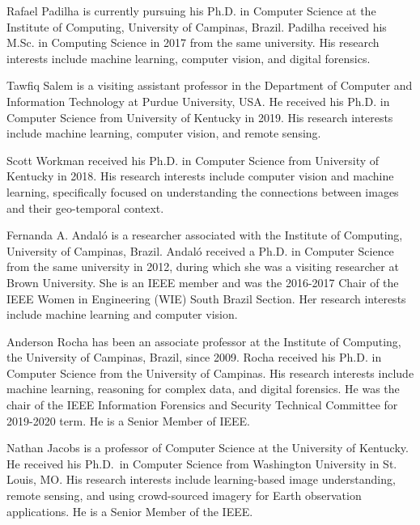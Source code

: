 \documentclass[journal]{IEEEtran}
\begin{document}
\begin{IEEEbiographynophoto}{Rafael Padilha}
is currently pursuing his Ph.D. in Computer Science at the Institute of Computing, University of Campinas, Brazil. Padilha received his M.Sc. in Computing Science in 2017 from the same university. His research interests include machine learning, computer vision, and digital forensics.
\end{IEEEbiographynophoto}

\begin{IEEEbiographynophoto}{Tawfiq Salem}
is a visiting assistant professor in the Department of Computer and Information Technology at Purdue University, USA. He received his Ph.D. in Computer Science from University of Kentucky in 2019. His research interests include machine learning, computer vision, and remote sensing.    
\end{IEEEbiographynophoto}

\begin{IEEEbiographynophoto}{Scott Workman}
received his Ph.D. in Computer Science from University of Kentucky in 2018. His research interests include computer vision and machine learning, specifically focused on understanding the connections between images and their geo-temporal context.
\end{IEEEbiographynophoto}

\begin{IEEEbiographynophoto}{Fernanda A. Andal\'{o}}
is a researcher associated with the Institute of Computing, University of Campinas, Brazil. Andal\'{o} received a Ph.D. in Computer Science from the same university in 2012, during which she was a visiting researcher at Brown University. She is an IEEE member and was the 2016-2017 Chair of the IEEE Women in Engineering (WIE) South Brazil Section. Her research interests include machine learning and computer vision.
\end{IEEEbiographynophoto}

\begin{IEEEbiographynophoto}{Anderson Rocha}
has been an associate professor at the Institute of Computing, the University of Campinas, Brazil, since 2009. Rocha received his Ph.D. in Computer Science from the University of Campinas. His research interests include machine learning, reasoning for complex data, and digital forensics. He was the chair of the IEEE Information Forensics and Security Technical Committee for 2019-2020 term. He is a Senior Member of IEEE.
\end{IEEEbiographynophoto}

\begin{IEEEbiographynophoto}{Nathan Jacobs}
is a professor of Computer Science at the University of Kentucky. He received his Ph.D.\ in Computer Science from Washington University in St. Louis, MO. His research interests include learning-based image understanding, remote sensing, and using crowd-sourced imagery for Earth observation applications. He is a Senior Member of the IEEE.
\end{IEEEbiographynophoto}
\end{document}
